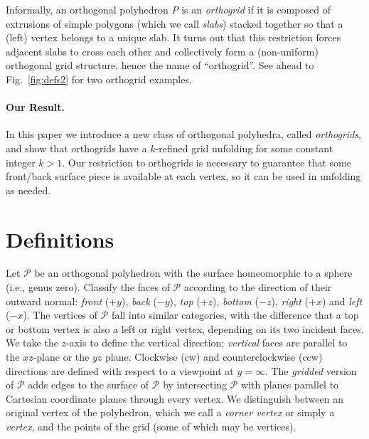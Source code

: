 \documentclass[11pt]{article}
\def\P{{\mathcal P}}
\begin{document}
Informally, an orthogonal polyhedron $P$ is an \emph{orthogrid} if it is composed of extrusions of simple polygons (which we call \emph{slabs}) stacked together so that a (left) vertex belongs to a unique slab. It turns out that this restriction forces adjacent slabs to cross each other and collectively form a (non-uniform) orthogonal grid structure, hence the name of ``orthogrid''. See ahead to Fig.~\ref{fig:defs2} for two orthogrid examples. 

\paragraph{Our Result.}  In this paper we introduce a new class of orthogonal polyhedra, called \emph{orthogrids}, and show that orthogrids have a $k$-refined grid unfolding for some constant integer $k > 1$. Our restriction to orthogrids is necessary to guarantee that some front/back surface piece is available at each vertex, so it can be used in unfolding as needed. 

\section{Definitions}
Let $\P$ be an orthogonal polyhedron with the surface homeomorphic to a sphere (i.e., genus zero).
Classify the faces of $\P$ according to the direction of their outward normal:
\emph{front} ($+y$), \emph{back} ($-y$), \emph{top} ($+z$),
\emph{bottom} ($-z$), \emph{right} ($+x$) and \emph{left} ($-x$). 
The vertices of $\P$ fall into similar categories, with the difference 
that a top or bottom vertex is also a left or right vertex, depending on its two incident faces. 
We take the $z$-axis
to define the vertical direction; \emph{vertical} faces are parallel to the $xz$-plane
or the $yz$ plane.  Clockwise (cw) and counterclockwise (ccw) directions are defined with
respect to a viewpoint at $y = \infty$. 
The \emph{gridded} version of $\P$ adds edges to the surface of $\P$ by
intersecting $\P$ with planes parallel to Cartesian coordinate planes
through every vertex. We distinguish between an original vertex of the polyhedron,
which we call a \emph{corner vertex} or simply a \emph{vertex}, and the points of the grid (some of which may be vertices). 
\end{document}
